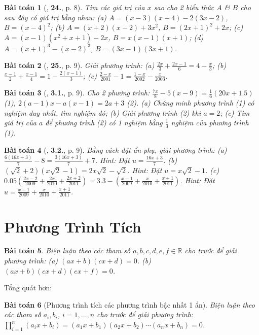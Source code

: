 \documentclass{article}
\numberwithin{equation}{section}
\newtheorem{baitoan}{Bài toán}
\begin{document}
\begin{baitoan}[\cite{SBT_Toan_8_tap_2}, \textbf{24.}, p. 8]
	Tìm các giá trị của $x$ sao cho 2 biểu thức $A$ \& $B$ cho sau đây có giá trị bằng nhau: (a) $A = (x - 3)(x + 4) - 2(3x - 2)$, $B = (x - 4)^2$; (b) $A = (x + 2)(x - 2) + 3x^2$, $B = (2x + 1)^2 + 2x$; (c) $A = (x - 1)(x^2 + x + 1) - 2x$, $B = x(x - 1)(x + 1)$; (d) $A = (x + 1)^3 - (x - 2)^3$, $B = (3x - 1)(3x + 1)$.
\end{baitoan}

\begin{baitoan}[\cite{SBT_Toan_8_tap_2}, \textbf{25.}, p. 9]
	Giải phương trình: (a) $\frac{2x}{3} + \frac{2x - 1}{6} = 4 - \frac{x}{3}$; (b) $\frac{x - 1}{2} + \frac{x - 1}{4} = 1 - \frac{2(x - 1)}{3}$; (c) $\frac{2 - x}{2001} - 1 = \frac{1 - x}{2002} - \frac{x}{2003}$.
\end{baitoan}

\begin{baitoan}[\cite{SBT_Toan_8_tap_2}, \textbf{3.1.}, p. 9]
	Cho 2 phương trình: $\frac{7x}{8} - 5(x - 9) = \frac{1}{6}(20x + 1.5)$ (1), $2(a - 1)x - a(x - 1) = 2a + 3$ (2). (a) Chứng minh phương trình (1) có nghiệm duy nhất, tìm nghiệm đó; (b) Giải phương trình (2) khi $a = 2$; (c) Tìm giá trị của $a$ để phương trình (2) có 1 nghiệm bằng $\frac{1}{3}$ nghiệm của phương trình (1).
\end{baitoan}

\begin{baitoan}[\cite{SBT_Toan_8_tap_2}, \textbf{3.2.}, p. 9]
	Bằng cách đặt ẩn phụ, giải phương trình: (a) $\frac{6(16x + 3)}{7} - 8 = \frac{3(16x + 3)}{7} + 7$. Hint: Đặt $u = \frac{16x + 3}{7}$. (b) $(\sqrt{2} + 2)(x\sqrt{2} - 1) = 2x\sqrt{2} - \sqrt{2}$. Hint: Đặt $u = x\sqrt{2} - 1$. (c) $0.05\left(\frac{2x - 2}{2009} + \frac{2x}{2010} + \frac{2x + 2}{2011}\right) = 3.3 - \left(\frac{x - 1}{2009} + \frac{x}{2010} + \frac{x + 1}{2011}\right)$. Hint: Đặt $u = \frac{x - 1}{2009} + \frac{x}{2010} + \frac{x + 1}{2011}$.
\end{baitoan}


\section{Phương Trình Tích}

\begin{baitoan}
	Biện luận theo các tham số $a,b,c,d,e,f\in\mathbb{R}$ cho trước để giải phương trình: (a) $(ax + b)(cx + d) = 0$. (b) $(ax + b)(cx + d)(ex + f) = 0$.
\end{baitoan}
Tổng quát hơn:
\begin{baitoan}[Phương trình tích các phương trình bậc nhất 1 ẩn]
	Biện luận theo các tham số $a_i,b_i$, $i = 1,\ldots,n$ cho trước để giải phương trình: $\prod_{i=1}^n (a_ix + b_i) = (a_1x + b_1)(a_2x + b_2)\cdots(a_nx + b_n) = 0$.
\end{baitoan}
\end{document}
